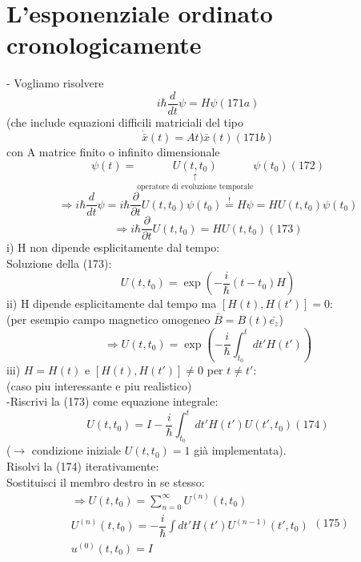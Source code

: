 \documentclass[a4paper,11pt]{report}
\newcommand{\x}{\bar{x}}
\begin{document}
\section{L'esponenziale ordinato cronologicamente}
- Vogliamo risolvere 
\begin{equation}
i\hbar \dfrac{d}{dt}\psi = H \psi (171a)
\end{equation}
(che include equazioni difficili matriciali del tipo 
\begin{equation}
\dot{\x}(t)=At)\x(t) (171b)
\end{equation}
con A matrice finito o infinito dimensionale
\begin{equation}
\psi(t)=\underset{\text{operatore di evoluzione temporale}}{\underset{\uparrow}{U(t,t_0)}}\psi(t_0) (172)
\end{equation}
$$
\Rightarrow i\hbar \dfrac{d}{dt}\psi = i\hbar \dfrac{\partial}{\partial t}U(t,t_0)\psi(t_0)\overset{!}{=}H\psi = HU(t,t_0)\psi(t_0)
$$
\begin{equation}
\Rightarrow i\hbar \dfrac{\partial }{\partial t}U(t,t_0)=HU(t,t_0) (173)
\end{equation}
i) H non dipende esplicitamente dal tempo: \\
Soluzione della (173):
$$
U(t,t_0)=\exp \left(-\dfrac{i}{\hbar}(t-t_0)H\right)
$$
ii) H dipende esplicitamente dal tempo ma $[H(t),H(t')]=0$:\\
(per esempio campo magnetico omogeneo $\bar{B}=B(t)\bar{e_z}$)
$$
\Rightarrow U(t,t_0)=\exp \left(-\dfrac{i}{\hbar}\int_{t_0}^t dt' H(t')\right)
$$
iii) $H=H(t)$ e $[H(t),H(t')]\neq 0$ per $t\neq t'$:\\
(caso piu interessante e piu realistico)\\
-Riscrivi la (173) come equazione integrale:
\begin{equation}
U(t,t_0) = I - \dfrac{i}{\hbar}\int_{t_0}^t dt' H(t')U(t',t_0) (174)
\end{equation}
($\rightarrow$ condizione iniziale $U(t,t_0)=1$ già implementata).\\
Risolvi la (174) iterativamente: \\
Sostituisci il membro destro in se stesso:
\begin{equation}
\begin{matrix}
\Rightarrow U(t,t_0)=\sum_{n=0}^\infty U^{(n)}(t,t_0)\\
U^{(n)}(t,t_0)=-\dfrac{i}{\hbar}\int dt' H(t') U^{(n-1)}(t',t_0)\\
u^{(0)}(t,t_0)=I
\end{matrix} (175)
\end{equation}
\end{document}
